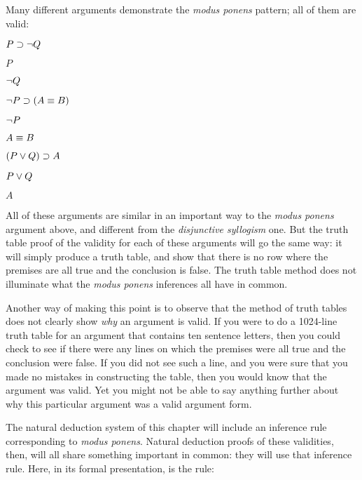 Many different arguments demonstrate the \emph{modus ponens} pattern; all of them are valid:

\begin{multicols}{3}
\begin{earg}
\item[] $P \supset \neg Q$
\item[] $P$
\item[\therefore] $\neg Q$
\end{earg}

\begin{earg}
\item[] $\neg P \supset (A \equiv B)$
\item[] $\neg P$
\item[\therefore] $A \equiv B$
\end{earg}

\begin{earg}
\item[] $(P \vee Q) \supset A$
\item[] $P \vee Q$
\item[\therefore] $A$
\end{earg}

\end{multicols}

All of these arguments are similar in an important way to the \emph{modus ponens} argument above, and different from the \emph{disjunctive syllogism} one. But the truth table proof of the validity for each of these arguments will go the same way: it will simply produce a truth table, and show that there is no row where the premises are all true and the conclusion is false. The truth table method does not illuminate what the \emph{modus ponens} inferences all have in common.

Another way of making this point is to observe that the method of truth tables does not clearly show \emph{why} an argument is valid. If you were to do a 1024-line truth table for an argument that contains ten sentence letters, then you could check to see if there were any lines on which the premises were all true and the conclusion were false. If you did not see such a line, and you were sure that you made no mistakes in constructing the table, then you would know that the argument was valid. Yet you might not be able to say anything further about why this particular argument was a valid argument form.

The natural deduction system of this chapter will include an inference rule corresponding to \emph{modus ponens}. Natural deduction proofs of these validities, then, will all share something important in common: they will use that inference rule. Here, in its formal presentation, is the rule:

